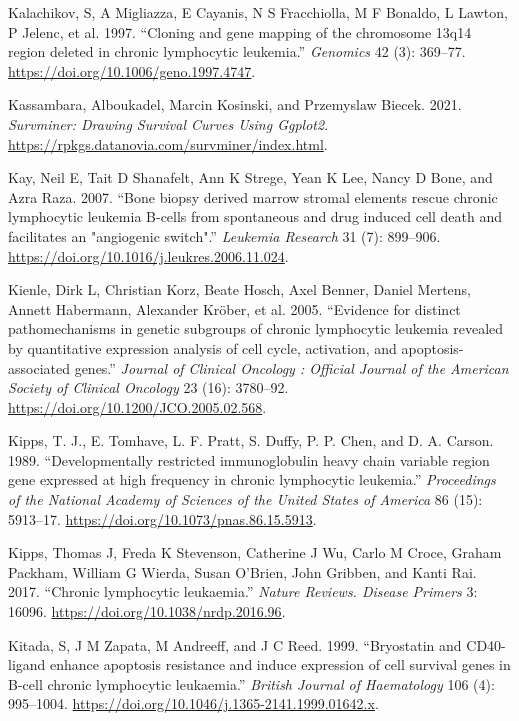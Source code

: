 \documentclass[11pt, a4paper, twosided]{book}
\newenvironment{CSLReferences}%
  {}%
  {\par}
\begin{document}
\begin{CSLReferences}{1}{0}
\leavevmode{}%
Kalachikov, S, A Migliazza, E Cayanis, N S Fracchiolla, M F Bonaldo, L Lawton, P Jelenc, et al. 1997. {``{Cloning and gene mapping of the chromosome 13q14 region deleted in chronic lymphocytic leukemia}.''} \emph{Genomics} 42 (3): 369--77. \url{https://doi.org/10.1006/geno.1997.4747}.

\leavevmode{}%
Kassambara, Alboukadel, Marcin Kosinski, and Przemyslaw Biecek. 2021. \emph{Survminer: Drawing Survival Curves Using Ggplot2}. \url{https://rpkgs.datanovia.com/survminer/index.html}.

\leavevmode{}%
Kay, Neil E, Tait D Shanafelt, Ann K Strege, Yean K Lee, Nancy D Bone, and Azra Raza. 2007. {``{Bone biopsy derived marrow stromal elements rescue chronic lymphocytic leukemia B-cells from spontaneous and drug induced cell death and facilitates an "angiogenic switch"}.''} \emph{Leukemia Research} 31 (7): 899--906. \url{https://doi.org/10.1016/j.leukres.2006.11.024}.

\leavevmode{}%
Kienle, Dirk L, Christian Korz, Beate Hosch, Axel Benner, Daniel Mertens, Annett Habermann, Alexander Kröber, et al. 2005. {``{Evidence for distinct pathomechanisms in genetic subgroups of chronic lymphocytic leukemia revealed by quantitative expression analysis of cell cycle, activation, and apoptosis-associated genes.}''} \emph{Journal of Clinical Oncology : Official Journal of the American Society of Clinical Oncology} 23 (16): 3780--92. \url{https://doi.org/10.1200/JCO.2005.02.568}.

\leavevmode{}%
Kipps, T. J., E. Tomhave, L. F. Pratt, S. Duffy, P. P. Chen, and D. A. Carson. 1989. {``{Developmentally restricted immunoglobulin heavy chain variable region gene expressed at high frequency in chronic lymphocytic leukemia}.''} \emph{Proceedings of the National Academy of Sciences of the United States of America} 86 (15): 5913--17. \url{https://doi.org/10.1073/pnas.86.15.5913}.

\leavevmode{}%
Kipps, Thomas J, Freda K Stevenson, Catherine J Wu, Carlo M Croce, Graham Packham, William G Wierda, Susan O'Brien, John Gribben, and Kanti Rai. 2017. {``{Chronic lymphocytic leukaemia.}''} \emph{Nature Reviews. Disease Primers} 3: 16096. \url{https://doi.org/10.1038/nrdp.2016.96}.

\leavevmode{}%
Kitada, S, J M Zapata, M Andreeff, and J C Reed. 1999. {``{Bryostatin and CD40-ligand enhance apoptosis resistance and induce expression of cell survival genes in B-cell chronic lymphocytic leukaemia.}''} \emph{British Journal of Haematology} 106 (4): 995--1004. \url{https://doi.org/10.1046/j.1365-2141.1999.01642.x}.


\end{CSLReferences}
\end{document}
